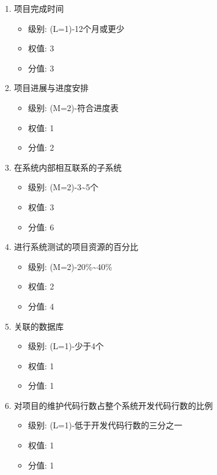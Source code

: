 \documentclass[hyperref, a4paper]{ctexart}
\providecommand{\tightlist}{%
  \setlength{\itemsep}{0pt}\setlength{\parskip}{0pt}}
\begin{document}
\begin{enumerate}
\def\labelenumi{\arabic{enumi}.}
\tightlist
\item
  项目完成时间

  \begin{itemize}
  \tightlist
  \item
    级别: (L=1)-12个月或更少
  \item
    权值: 3
  \item
    分值: 3
  \end{itemize}
\item
  项目进展与进度安排

  \begin{itemize}
  \tightlist
  \item
    级别: (M=2)-符合进度表
  \item
    权值: 1
  \item
    分值: 2
  \end{itemize}
\item
  在系统内部相互联系的子系统

  \begin{itemize}
  \tightlist
  \item
    级别: (M=2)-3\textasciitilde5个
  \item
    权值: 3
  \item
    分值: 6
  \end{itemize}
\item
  进行系统测试的项目资源的百分比

  \begin{itemize}
  \tightlist
  \item
    级别: (M=2)-20\%\textasciitilde40\%
  \item
    权值: 2
  \item
    分值: 4
  \end{itemize}
\item
  关联的数据库

  \begin{itemize}
  \tightlist
  \item
    级别: (L=1)-少于4个
  \item
    权值: 1
  \item
    分值: 1
  \end{itemize}
\item
  对项目的维护代码行数占整个系统开发代码行数的比例

  \begin{itemize}
  \tightlist
  \item
    级别: (L=1)-低于开发代码行数的三分之一
  \item
    权值: 1
  \item
    分值: 1
  \end{itemize}
\end{enumerate}
\end{document}
